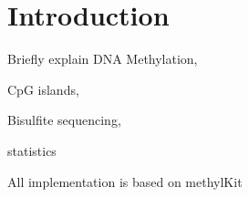 \section{Introduction}

Briefly explain DNA Methylation, 

CpG islands, 

Bisulfite sequencing, 

statistics

All implementation is based on methylKit \cite{23034086}
  
  
  
  
  
  
  
  